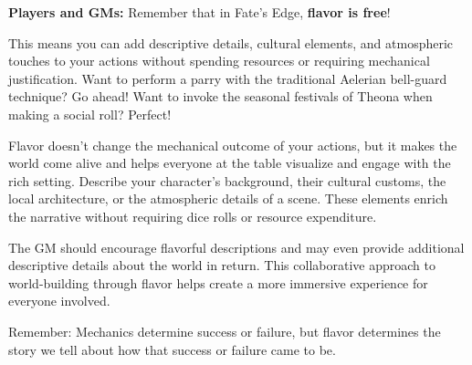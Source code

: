 \begin{tcolorbox}[enhanced, sharp corners, boxrule=1pt, colback=gray!5!white, colframe=gray!75!black, title={Flavor is Free}]
\textbf{Players and GMs:} Remember that in Fate's Edge, \textbf{flavor is free}!

This means you can add descriptive details, cultural elements, and atmospheric touches to your actions without spending resources or requiring mechanical justification. Want to perform a parry with the traditional Aelerian bell-guard technique? Go ahead! Want to invoke the seasonal festivals of Theona when making a social roll? Perfect!

Flavor doesn't change the mechanical outcome of your actions, but it makes the world come alive and helps everyone at the table visualize and engage with the rich setting. Describe your character's background, their cultural customs, the local architecture, or the atmospheric details of a scene. These elements enrich the narrative without requiring dice rolls or resource expenditure.

The GM should encourage flavorful descriptions and may even provide additional descriptive details about the world in return. This collaborative approach to world-building through flavor helps create a more immersive experience for everyone involved.

Remember: Mechanics determine success or failure, but flavor determines the story we tell about how that success or failure came to be.
\end{tcolorbox}

